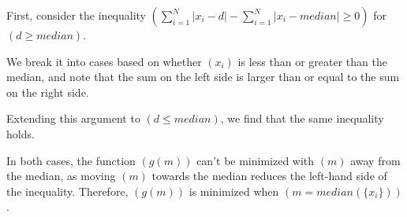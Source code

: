 \documentclass{report}
\begin{document}
\qquad First, consider the inequality $(\sum_{i=1}^{N} |x_i - d| - \sum_{i=1}^{N} |x_i - median| \geq 0)$ for $(d \geq median)$.
\newline

We break it into cases based on whether $(x_i)$ is less than or greater than the median, and note that the sum on the left side is larger than or equal to the sum on the right side.
\newline

Extending this argument to $(d \leq median)$, we find that the same inequality holds.
\newline

In both cases, the function $(g(m))$ can't be minimized with $(m)$ away from the median, as moving $(m)$ towards the median reduces the left-hand side of the inequality. Therefore, $(g(m))$ is minimized when $(m = median(\{x_i\}))$. 
\end{document}
